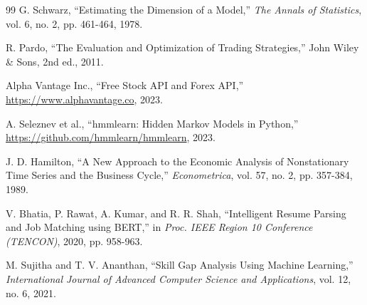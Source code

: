 \documentclass[conference]{IEEEtran}
\begin{document}
\begin{thebibliography}{99}
G. Schwarz, ``Estimating the Dimension of a Model,'' \textit{The Annals of Statistics}, vol. 6, no. 2, pp. 461-464, 1978.

R. Pardo, ``The Evaluation and Optimization of Trading Strategies,'' John Wiley \& Sons, 2nd ed., 2011.

Alpha Vantage Inc., ``Free Stock API and Forex API,'' \url{https://www.alphavantage.co}, 2023.

A. Seleznev et al., ``hmmlearn: Hidden Markov Models in Python,'' \url{https://github.com/hmmlearn/hmmlearn}, 2023.

J. D. Hamilton, ``A New Approach to the Economic Analysis of Nonstationary Time Series and the Business Cycle,'' \textit{Econometrica}, vol. 57, no. 2, pp. 357-384, 1989.

V. Bhatia, P. Rawat, A. Kumar, and R. R. Shah, ``Intelligent Resume Parsing and Job Matching using BERT,'' in \textit{Proc. IEEE Region 10 Conference (TENCON)}, 2020, pp. 958-963.

M. Sujitha and T. V. Ananthan, ``Skill Gap Analysis Using Machine Learning,'' \textit{International Journal of Advanced Computer Science and Applications}, vol. 12, no. 6, 2021.

\end{thebibliography}
\end{document}
